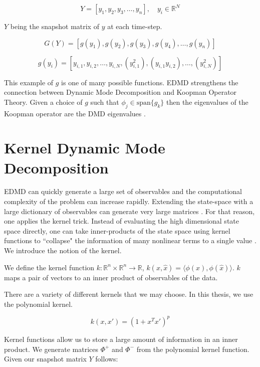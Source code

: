 $$
Y = [y_1, y_2, y_3, \dots, y_n ], \quad y_i \in \mathbb{R}^{N}
$$

\noindent $Y$ being the snapshot matrix of $y$ at each time-step.

$$
G(Y) = [g(y_1), g(y_2), g(y_3), g(y_4), \dots , g(y_n)]
$$

$$
g(y_i) = [y_{i,1}, y_{i,2},\dots, y_{i,N}, (y^{2}_{i,1}), (y_{i,1}y_{i,2}), \dots, (y^{2}_{i,N})]
$$

 This example of $g$ is one of many possible functions. EDMD strengthens the connection 
between Dynamic Mode Decomposition and Koopman Operator Theory. Given a 
choice of $g$ such that $\phi_j \in \text{span}\{g_k\}$ then the eigenvalues of the 
Koopman operator are the DMD eigenvalues \cite{doi:10.1137/1.9781611974508}.

\section{Kernel Dynamic Mode Decomposition}

EDMD can quickly generate a large set of observables
 and the computational complexity of the problem can increase rapidly.
  Extending the state-space with a large dictionary of observables 
  can generate very large matrices \cite{williams2015kernelbased}. For that reason, one applies the kernel trick. Instead of evaluating
the high dimensional state space directly, one can take inner-products of the state space using kernel functions
to ``collapse" the information of many nonlinear terms to a single value \cite{doi:10.1137/1.9781611974508}. 
We introduce the notion of the kernel.

\begin{dfn}
    We define the kernel function $k:\mathbb{R}^n \times \mathbb{R}^n \rightarrow \mathbb{R}$, $ k(x,{\hat x}) = \langle \phi(x), \phi({\hat x})\rangle$.
    $k$ maps a pair of vectors to an inner product of observables of the data.
\end{dfn}

\noindent There are a variety of different kernels that we may choose. In this thesis, we use the polynomial kernel.

$$
k(x,x') = (1 + x^Tx')^p
$$

\vspace{3mm}

Kernel functions allow us to store a large amount of information in an inner product. We generate matrices
$\Phi^+$ and $\Phi^-$ from the polynomial kernel function. Given our snapshot matrix $Y$
follows:

